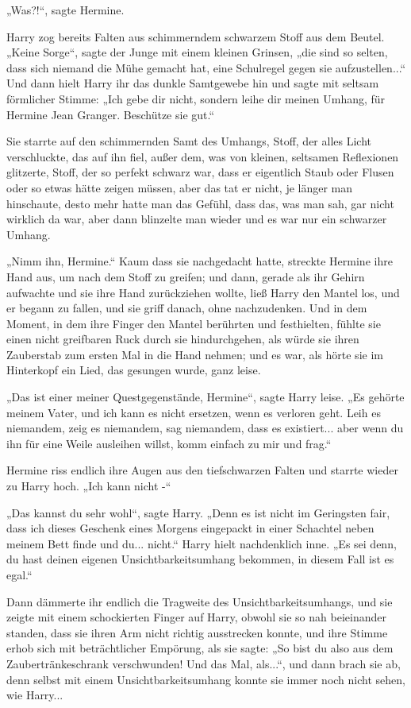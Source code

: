 {„Was?!“, sagte Hermine.

Harry zog bereits Falten aus schimmerndem schwarzem Stoff aus dem Beutel.\\ „Keine Sorge“, sagte der Junge mit einem kleinen Grinsen, „die sind so selten, dass sich niemand die Mühe gemacht hat, eine Schulregel gegen sie aufzustellen...“ Und dann hielt Harry ihr das dunkle Samtgewebe hin und sagte mit seltsam förmlicher Stimme: „Ich gebe dir nicht, sondern leihe dir meinen Umhang, für Hermine Jean Granger. Beschütze sie gut.“

Sie starrte auf den schimmernden Samt des Umhangs, Stoff, der alles Licht verschluckte, das auf ihn fiel, außer dem, was von kleinen, seltsamen Reflexionen glitzerte, Stoff, der so perfekt schwarz war, dass er eigentlich Staub oder Flusen oder so etwas hätte zeigen müssen, aber das tat er nicht, je länger man hinschaute, desto mehr hatte man das Gefühl, dass das, was man sah, gar nicht wirklich da war, aber dann blinzelte man wieder und es war nur ein schwarzer Umhang.

„Nimm ihn, Hermine.“ Kaum dass sie nachgedacht hatte, streckte Hermine ihre Hand aus, um nach dem Stoff zu greifen; und dann, gerade als ihr Gehirn aufwachte und sie ihre Hand zurückziehen wollte, ließ Harry den Mantel los, und er begann zu fallen, und sie griff danach, ohne nachzudenken. Und in dem Moment, in dem ihre Finger den Mantel berührten und festhielten, fühlte sie einen nicht greifbaren Ruck durch sie hindurchgehen, als würde sie ihren Zauberstab zum ersten Mal in die Hand nehmen; und es war, als hörte sie im Hinterkopf ein Lied, das gesungen wurde, ganz leise.

„Das ist einer meiner Questgegenstände, Hermine“, sagte Harry leise. „Es gehörte meinem Vater, und ich kann es nicht ersetzen, wenn es verloren geht. Leih es niemandem, zeig es niemandem, sag niemandem, dass es existiert... aber wenn du ihn für eine Weile ausleihen willst, komm einfach zu mir und frag.“

Hermine riss endlich ihre Augen aus den tiefschwarzen Falten und starrte wieder zu Harry hoch. „Ich kann nicht -“

„Das kannst du sehr wohl“, sagte Harry. „Denn es ist nicht im Geringsten fair, dass ich dieses Geschenk eines Morgens eingepackt in einer Schachtel neben meinem Bett finde und du... nicht.“ Harry hielt nachdenklich inne. „Es sei denn, du hast deinen eigenen Unsichtbarkeitsumhang bekommen, in diesem Fall ist es egal.“

Dann dämmerte ihr endlich die Tragweite des Unsichtbarkeitsumhangs, und sie zeigte mit einem schockierten Finger auf Harry, obwohl sie so nah beieinander standen, dass sie ihren Arm nicht richtig ausstrecken konnte, und ihre Stimme erhob sich mit beträchtlicher Empörung, als sie sagte: „So bist du also aus dem Zaubertränkeschrank verschwunden! Und das Mal, als...“, und dann brach sie ab, denn selbst mit einem Unsichtbarkeitsumhang konnte sie immer noch nicht sehen, wie Harry...

}
